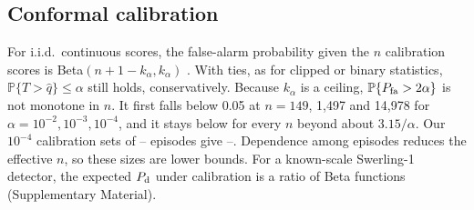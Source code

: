 \documentclass[journal]{IEEEtran}
\newcommand{\PP}{\mathbb{P}}
\begin{document}
\subsection{Conformal calibration}\label{sec:calib}
For i.i.d.\ continuous scores, the false-alarm probability given the $n$ calibration scores is Beta$(n+1-k_\alpha,k_\alpha)$ \cite{vovk2012}. With ties, as for clipped or binary statistics, $\PP\{T>\widehat q\}\le\alpha$ still holds, conservatively. Because $k_\alpha$ is a ceiling, $\PP\{P_{\rm fa}>2\alpha\}$ is not monotone in $n$. It first falls below 0.05 at $n=149$, 1,497 and 14,978 for $\alpha=10^{-2},10^{-3},10^{-4}$, and it stays below for every $n$ beyond about $3.15/\alpha$. Our $10^{-4}$ calibration sets of \DwellCalMin--\LowCalMax{} episodes give \LowCalPtwoMin--\LowCalPtwoMax. Dependence among episodes reduces the effective $n$, so these sizes are lower bounds. For a known-scale Swerling-1 detector, the expected $P_{\rm d}$ under calibration is a ratio of Beta functions (Supplementary Material).
\end{document}
